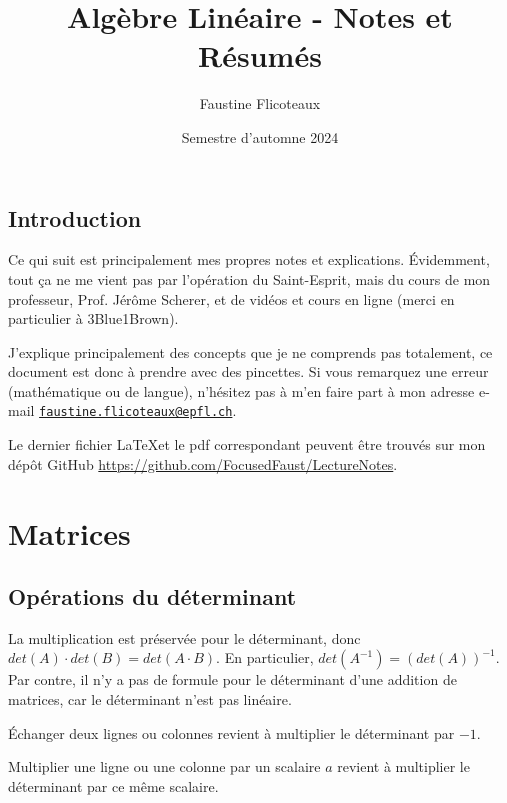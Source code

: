 \documentclass[10pt,a4paper]{book}
\title{Algèbre Linéaire - Notes et Résumés}
\author{Faustine Flicoteaux}
\date{Semestre d'automne 2024}
\begin{document}
\maketitle
\tableofcontents
\newpage


\section*{Introduction}
Ce qui suit est principalement mes propres notes et explications. Évidemment, tout ça ne me vient pas par l'opération du Saint-Esprit, mais du cours de mon professeur, Prof. Jérôme Scherer, et de vidéos et cours en ligne (merci en particulier à 3Blue1Brown).\par 
J'explique principalement des concepts que je ne comprends pas totalement, ce document est donc à prendre avec des pincettes. Si vous remarquez une erreur (mathématique ou de langue), n'hésitez pas à m'en faire part à mon adresse e-mail \texttt{\href{mailto:faustine.flicoteaux@epfl.ch}{faustine.flicoteaux@epfl.ch}}.\par 
Le dernier fichier \LaTeX et le pdf correspondant peuvent être trouvés sur mon dépôt GitHub \url{https://github.com/FocusedFaust/LectureNotes}.

\chapter{Matrices}
\section{Opérations du déterminant}
La multiplication est préservée pour le déterminant, donc $det(A)\cdot det(B) = det(A\cdot B)$. En particulier, $det(A^{-1}) = (det(A))^{-1}$. Par contre, il n'y a pas de formule pour le déterminant d'une addition de matrices, car le déterminant n'est pas linéaire.\par 
Échanger deux lignes ou colonnes revient à multiplier le déterminant par $-1$.\par 
Multiplier une ligne ou une colonne par un scalaire $a$ revient à multiplier le déterminant par ce même scalaire.
\end{document}
